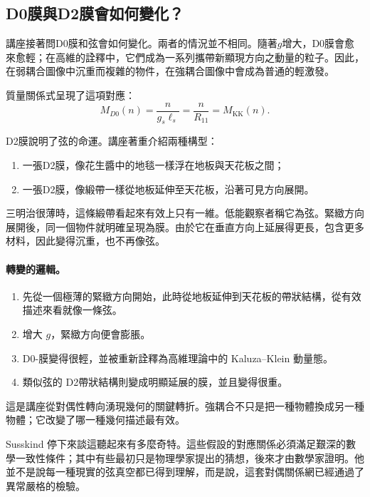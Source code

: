 \subsection{D0膜與D2膜會如何變化？}

講座接著問D0膜和弦會如何變化。兩者的情況並不相同。隨著\(g\)增大，D0膜會愈來愈輕；在高維的詮釋中，它們成為一系列攜帶新顯現方向之動量的粒子。因此，在弱耦合圖像中沉重而複雜的物件，在強耦合圖像中會成為普通的輕激發。

質量關係式呈現了這項對應：
\begin{equation}
M_{D0}(n)=\frac{n}{g_s\ell_s}
=\frac{n}{R_{11}}
=M_{\mathrm{KK}}(n).
\end{equation}

D2膜說明了弦的命運。講座著重介紹兩種構型：
\begin{enumerate}
\item 一張D2膜，像花生醬中的地毯一樣浮在地板與天花板之間；
\item 一張D2膜，像緞帶一樣從地板延伸至天花板，沿著可見方向展開。
\end{enumerate}
三明治很薄時，這條緞帶看起來有效上只有一維。低能觀察者稱它為弦。緊緻方向展開後，同一個物件就明確呈現為膜。由於它在垂直方向上延展得更長，包含更多材料，因此變得沉重，也不再像弦。

\paragraph{轉變的邏輯。}
\begin{enumerate}
\item 先從一個極薄的緊緻方向開始，此時從地板延伸到天花板的帶狀結構，從有效描述來看就像一條弦。
\item 增大 \(g\)，緊緻方向便會膨脹。
\item D0-膜變得很輕，並被重新詮釋為高維理論中的 Kaluza--Klein 動量態。
\item 類似弦的 D2帶狀結構則變成明顯延展的膜，並且變得很重。
\end{enumerate}
這是講座從對偶性轉向湧現幾何的關鍵轉折。強耦合不只是把一種物體換成另一種物體；它改變了哪一種幾何描述最有效。

Susskind 停下來談這聽起來有多麼奇特。這些假設的對應關係必須滿足艱深的數學一致性條件；其中有些最初只是物理學家提出的猜想，後來才由數學家證明。他並不是說每一種現實的弦真空都已得到理解，而是說，這套對偶關係網已經通過了異常嚴格的檢驗。

